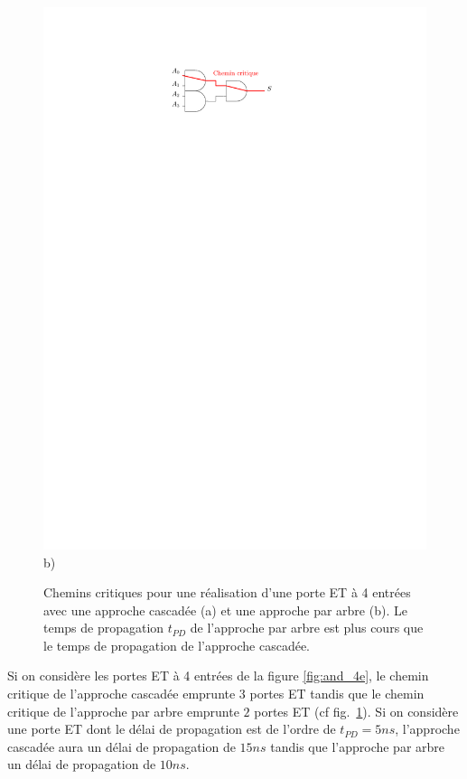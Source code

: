 \begin{figure}[htbp]
\begin{minipage}[c]{.36\linewidth}
\includegraphics[width=\columnwidth]{Figs/and_4e_arbre_critique.pdf} \\\centering b)
   \end{minipage}
\caption{\label{fig:and_4e_critique} Chemins critiques pour une réalisation d'une porte ET à 4 entrées avec une approche cascadée (a) et une approche par arbre (b). Le temps de propagation $t_{PD}$ de l'approche par arbre est plus cours que le temps de propagation de l'approche cascadée.}
\end{figure}

Si on considère les portes ET à 4 entrées de la figure \ref{fig:and_4e}, le chemin critique de l'approche cascadée emprunte $3$ portes ET tandis que le chemin critique de l'approche par arbre emprunte $2$ portes ET (cf fig.~\ref{fig:and_4e_critique}). Si on considère une porte ET dont le délai de propagation est de l'ordre de $t_{PD} = 5 ns$, l'approche cascadée aura un délai de propagation de $15 ns$ tandis que l'approche par arbre un délai de propagation de $10 ns$.

